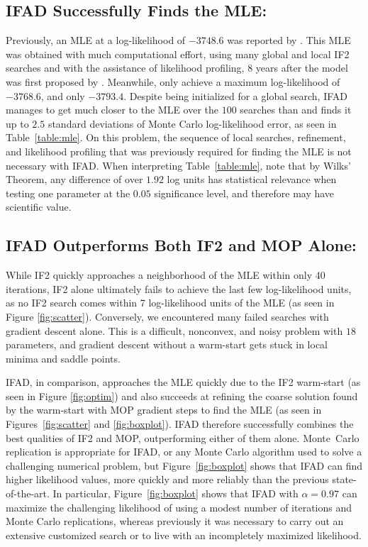 \documentclass[numsec,webpdf,modern,medium,namedate]{oup-authoring-template}
\theoremstyle{thmstyleone}%
\theoremstyle{thmstyletwo}%
\theoremstyle{thmstylethree}%
\begin{document}
\subsection{IFAD Successfully Finds the MLE:} Previously, an MLE at a log-likelihood of $-3748.6$ was reported by \cite{king16}.
This MLE was obtained with much computational effort, using many global and local IF2 searches and with the assistance of likelihood profiling, 8 years after the model was first proposed by \cite{king08}.
Meanwhile, \cite{ionides15} only achieve a maximum log-likelihood of $-3768.6$, and \cite{king08} only $-3793.4$.
Despite being initialized for a global search, IFAD manages to get much closer to the MLE over the $100$ searches than \cite{ionides15} and finds it up to $2.5$ standard deviations of Monte Carlo log-likelihood error, as seen in Table~\ref{table:mle}.
On this problem, the sequence of local searches, refinement, and likelihood profiling that was previously required for finding the MLE is not necessary with IFAD. 
When interpreting Table~\ref{table:mle}, note that by Wilks' Theorem, any difference of over $1.92$ log units has statistical relevance when testing one parameter at the $0.05$ significance level, and therefore may have scientific value.

\subsection{IFAD Outperforms Both IF2 and MOP Alone:} While IF2 quickly approaches a neighborhood of the MLE within only 40 iterations, IF2 alone ultimately fails to achieve the last few log-likelihood units, as no IF2 search comes within 7 log-likelihood units of the MLE (as seen in Figure \ref{fig:scatter}). Conversely, we encountered many failed searches with gradient descent alone. This is a difficult, nonconvex, and noisy problem with $18$ parameters, and gradient descent without a warm-start gets stuck in local minima and saddle points.

IFAD, in comparison, approaches the MLE quickly due to the IF2 warm-start (as seen in Figure \ref{fig:optim}) and also succeeds at refining the coarse solution found by the warm-start with MOP gradient steps to find the MLE (as seen in Figures~\ref{fig:scatter} and \ref{fig:boxplot}). IFAD therefore successfully combines the best qualities of IF2 and MOP, outperforming either of them alone.
Monte~Carlo replication is appropriate for IFAD, or any Monte Carlo algorithm used to solve a challenging numerical problem, but Figure~\ref{fig:boxplot} shows that IFAD can find higher likelihood values, more quickly and more reliably than the previous state-of-the-art. 
In particular, Figure~\ref{fig:boxplot} shows that IFAD with $\alpha=0.97$ can maximize the challenging likelihood of \cite{king08} using a modest number of iterations and Monte Carlo replications, whereas previously it was necessary to carry out an extensive customized search or to live with an incompletely maximized likelihood.
\end{document}
